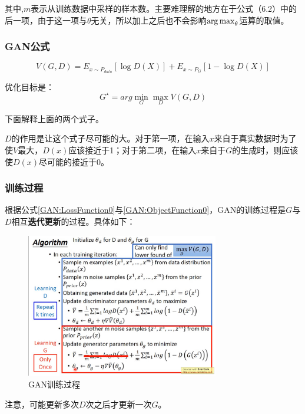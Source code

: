 其中,$m$表示从训练数据中采样的样本数。主要难理解的地方在于公式（6.2）中的后一项，由于这一项与$\theta$无关，所以加上之后也不会影响$\operatorname*{arg\,max}_{\theta}$运算的取值。

\subsubsection{GAN公式}

\begin{equation}
\label{GAN:LossFunction0}
V(G, D) = E_{x \sim P_{data}}\left[ \log D(X) \right] + E_{x \sim P_{G}}\left[ 1-\log D(X) \right]
\end{equation}

优化目标是：
\begin{equation}
\label{GAN:ObjectFunction0}
G^{\star} = arg \min_G \max_D V(G, D)
\end{equation}

下面解释上面的两个式子。

$D$的作用是让这个式子尽可能的大。对于第一项，在输入$x$来自于真实数据时为了使$V$最大，$D(x)$应该接近于1；对于第二项，在输入$x$来自于$G$的生成时，则应该使$D(x)$尽可能的接近于0。

\subsubsection{训练过程}

根据公式\ref{GAN:LossFunction0}与\ref{GAN:ObjectFunction0}，GAN的训练过程是$G$与$D$相互\textbf{迭代更新}的过程。具体如下：
\begin{figure}[!hbtp]
\centering
\includegraphics[width=0.75\textwidth]{OpenSetRecognition/GANTraining0.jpg}
\caption{GAN训练过程}
\label{GAN:Training0}
\end{figure}
注意，可能更新多次$D$次之后才更新一次$G$。



